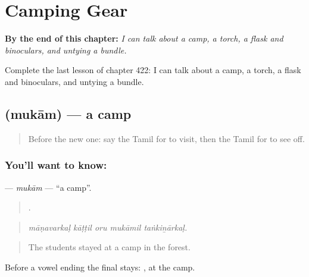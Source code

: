 
\chapter{Camping Gear}
\label{ch:ta-camping-gear}

\begin{chapteropening}
\textbf{By the end of this chapter:} \emph{I can talk about a camp, a torch, a flask and binoculars, and untying a bundle.}

Complete the last lesson of chapter 422: I can talk about a camp, a torch, a flask and binoculars, and untying a bundle.
\end{chapteropening}

\section[\texorpdfstring{\ta{முகாம்} (mukām)}{முகாம் (mukām)}]{ (mukām) — a camp}

\label{lesson:TA-C422-mukam}



\begin{quote}
Before the new one: say the Tamil for to visit, then the Tamil for to see off.
\end{quote}

\subsection*{You'll want to know: }
\textbf{} — \emph{mukām} — \textquotedblleft{}a camp\textquotedblright{}.

\begin{quote}
    .
\end{quote}

\begin{quote}
\emph{māṇavarkaḷ kāṭṭil oru mukāmil taṅkiṉārkaḷ.}
\end{quote}

\begin{quote}
The students stayed at a camp in the forest.
\end{quote}

Before a vowel ending the final  stays: , at the camp.

